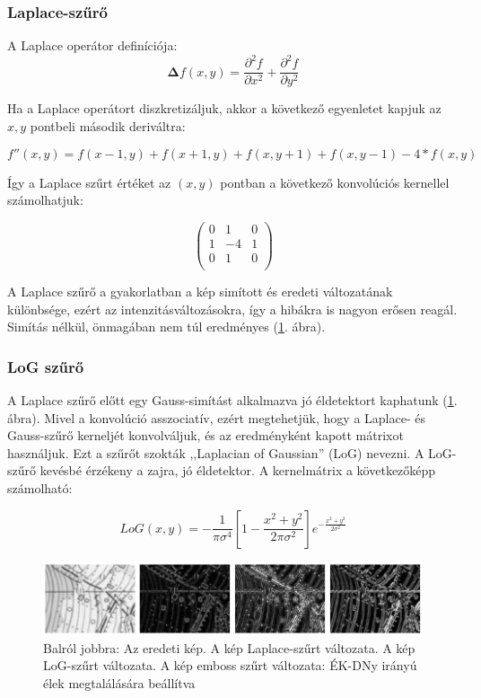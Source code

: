 \documentclass[a4paper,12pt]{article}
\begin{document}
\subsubsection{Laplace-szűrő}

A Laplace operátor definíciója: $$\mathbf{\Delta}{f(x,y)}=\frac{\partial^2
	f}{\partial x^2}+\frac{\partial^2 f}{\partial y^2}$$

Ha a Laplace operátort diszkretizáljuk, akkor a következő egyenletet kapjuk az
$x,y$ pontbeli második deriváltra:

$$ f''(x,y)=f(x-1,y)+f(x+1,y)+f(x,y+1)+f(x,y-1)-4*f(x,y)$$

Így a Laplace szűrt értéket az $(x,y)$ pontban a következő konvolúciós kernellel
számolhatjuk:


\begin{displaymath}
\left(
\begin{array}{ccc}
0 & 1 & 0\\
1 & -4 & 1 \\
0 & 1 & 0 \\
\end{array}
\right)
\end{displaymath}


A Laplace szűrő a gyakorlatban a kép simított és eredeti változatának
különbsége, ezért az intenzitásváltozásokra, így a hibákra is nagyon erősen
reagál. Simítás nélkül, önmagában nem túl eredményes  (\ref{fig:laplace_szurok}.
ábra).

\subsubsection{LoG szűrő}

A Laplace szűrő előtt egy Gauss-simítást alkalmazva jó éldetektort kaphatunk
(\ref{fig:laplace_szurok}. ábra). Mivel a konvolúció asszociatív, ezért
megtehetjük, hogy a Laplace- és Gauss-szűrő kerneljét konvolváljuk, és az
eredményként kapott mátrixot használjuk. Ezt a szűrőt szokták ,,Laplacian of
Gaussian'' (LoG) nevezni. A LoG-szűrő kevésbé érzékeny a zajra, jó éldetektor. A
kernelmátrix a következőképp számolható:

$$LoG(x,y)=-\frac{1}{\pi \sigma^4} \left [ 1-\frac{x^2 + y^2}{2 \pi \sigma^2}
\right ] e^{-\frac{x^2+y^2}{2 \sigma^2}}$$


\begin{figure}
	\centering
	\includegraphics[width=14cm]{laplace_szurok.png}
	\caption{Balról jobbra: Az eredeti kép. A kép Laplace-szűrt változata. A kép
		LoG-szűrt változata. A kép emboss szűrt változata: ÉK-DNy irányú élek
		megtalálására beállítva}
	\label{fig:laplace_szurok}
\end{figure}
\end{document}
